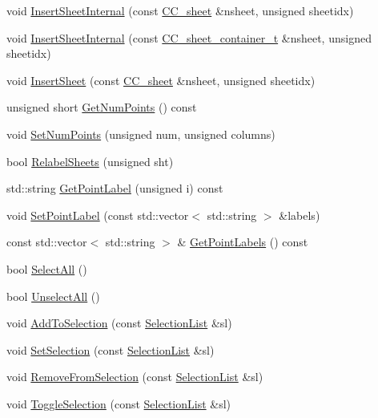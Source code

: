 \begin{DoxyCompactItemize}
\item 
void \hyperlink{a00020_a572a00b153485ce85c34262d66bdfffe}{Insert\-Sheet\-Internal} (const \hyperlink{a00045}{C\-C\-\_\-sheet} \&nsheet, unsigned sheetidx)
\item 
void \hyperlink{a00020_a91888ec48bb8b757d4a283a7d9b9ddaa}{Insert\-Sheet\-Internal} (const \hyperlink{a00020_ab378b0e2a08984cfda6487b5161e520c}{C\-C\-\_\-sheet\-\_\-container\-\_\-t} \&nsheet, unsigned sheetidx)
\item 
void \hyperlink{a00020_aa53e408dc4207c9ba0cf8de3eadf6bf5}{Insert\-Sheet} (const \hyperlink{a00045}{C\-C\-\_\-sheet} \&nsheet, unsigned sheetidx)
\item 
unsigned short \hyperlink{a00020_a5df09716c299172f2e8a99b1a90267e5}{Get\-Num\-Points} () const 
\item 
void \hyperlink{a00020_a3b373d2e691b8a5f2f719f4eee37f3dd}{Set\-Num\-Points} (unsigned num, unsigned columns)
\item 
bool \hyperlink{a00020_aa78b0dc2aee7cc0a66ddbd41c9231093}{Relabel\-Sheets} (unsigned sht)
\item 
std\-::string \hyperlink{a00020_a661207ede21362e43acb5399755115a5}{Get\-Point\-Label} (unsigned i) const 
\item 
void \hyperlink{a00020_a898de26e0833809c2df3870b1e800834}{Set\-Point\-Label} (const std\-::vector$<$ std\-::string $>$ \&labels)
\item 
const std\-::vector$<$ std\-::string $>$ \& \hyperlink{a00020_a3733a8b0ba76987f61b22a5a5fa1f05b}{Get\-Point\-Labels} () const 
\item 
bool \hyperlink{a00020_a79e6fc4893b17057221f0b6f7cf259cb}{Select\-All} ()
\item 
bool \hyperlink{a00020_aca913f542da51caebfff9efa14adbe94}{Unselect\-All} ()
\item 
void \hyperlink{a00020_af33d8ef299f4bf47949078f2a505c505}{Add\-To\-Selection} (const \hyperlink{a00214_aaec86d4bb87e1e6f0b60e6e551c5e570}{Selection\-List} \&sl)
\item 
void \hyperlink{a00020_afa0213a64648754e4a40fe0310ae795c}{Set\-Selection} (const \hyperlink{a00214_aaec86d4bb87e1e6f0b60e6e551c5e570}{Selection\-List} \&sl)
\item 
void \hyperlink{a00020_a006550de9209e5e3785d92d2e3101f97}{Remove\-From\-Selection} (const \hyperlink{a00214_aaec86d4bb87e1e6f0b60e6e551c5e570}{Selection\-List} \&sl)
\item 
void \hyperlink{a00020_ad7065faea6e297d81be3de222a63900b}{Toggle\-Selection} (const \hyperlink{a00214_aaec86d4bb87e1e6f0b60e6e551c5e570}{Selection\-List} \&sl)

\end{DoxyCompactItemize}
